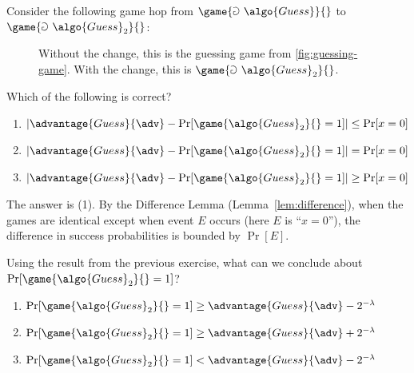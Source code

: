 \begin{exercise}
  Consider the following game hop from $\game{\Game~\algo{Guess}}{}$ to $\game{\Game~\algo{Guess}_2}{}$:
  
  \begin{figure}[h!]
    \begin{center}
      \begin{tcolorbox}[width=3cm]
        \begin{pchstack}[center]
        \end{pchstack}
      \end{tcolorbox}
    \end{center}
    \caption{Without the  change, this is the guessing game from \autoref{fig:guessing-game}. With the change, this is $\game{\Game~\algo{Guess}_2}{}$.}
  \end{figure}
  
  Which of the following is correct?
  \begin{enumerate}
    \item $\left|\advantage{Guess}{\adv} - \Pr[\game{\algo{Guess}_2}{} = 1]\right| \leq \Pr[x = 0]$
    \item $\left|\advantage{Guess}{\adv} - \Pr[\game{\algo{Guess}_2}{} = 1]\right| = \Pr[x = 0]$
    \item $\left|\advantage{Guess}{\adv} - \Pr[\game{\algo{Guess}_2}{} = 1]\right| \geq \Pr[x = 0]$
  \end{enumerate}
\end{exercise}

\ifsolutions
\begin{mysolution}
  The answer is (1).
  By the Difference Lemma (Lemma~\ref{lem:difference}), when the games are identical except when event $E$ occurs (here $E$ is ``$x = 0$''), the difference in success probabilities is bounded by $\Pr[E]$.
\end{mysolution}
\fi

\begin{exercise}
  Using the result from the previous exercise, what can we conclude about $\Pr[\game{\algo{Guess}_2}{} = 1]$?
  \begin{enumerate}
    \item $\Pr[\game{\algo{Guess}_2}{} = 1] \geq \advantage{Guess}{\adv} - 2^{-\lambda}$
    \item $\Pr[\game{\algo{Guess}_2}{} = 1] \geq \advantage{Guess}{\adv} + 2^{-\lambda}$
    \item $\Pr[\game{\algo{Guess}_2}{} = 1] < \advantage{Guess}{\adv} - 2^{-\lambda}$
  \end{enumerate}
\end{exercise}

